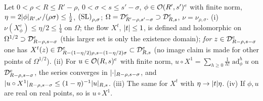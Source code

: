 \begin{theorem}\label{bpN:p11:composition}
Let $0<\rho<R\le R'-\rho$, $0<\sigma<s\le s'-\sigma$, $\phi\in\mathcal O(R',s')^e$ with finite norm, $\eta=2\lvert \phi\rvert_{R',s'}/(\rho\sigma)\le\frac12$, $\textup{(SL)}_{\rho,\sigma}$; $\Omega=\mathcal D_{R'-\rho,s'-\sigma}^e\supset\mathcal D_{R,s}^e$, $\nu=\nu_{\rho,\sigma}$.
(i) $\nu(X^c_\phi)\le\eta/2\le\frac14$ on $\Omega$; the flow $X^t$, $\lvert t\rvert\le1$, is defined and holomorphic on $\Omega^{1/2}\supset\mathcal D_{R-\rho,s-\sigma}^e$ (this larger set is only the existence domain); \emph{for $z\in\mathcal D_{R-\rho,s-\sigma}^e$} one has $X^t(z)\in\mathcal D_{R-(1-\eta/2)\rho,s-(1-\eta/2)\sigma}^e\subset\mathcal D_{R,s}^e$ (no image claim is made for other points of $\Omega^{1/2}$).
(ii) For $u\in\mathcal O(R,s)^e$ with finite norm, $u\circ X^1=\sum_{h\ge0}\frac1{h!}\operatorname{ad}^h_\phi u$ on $\mathcal D_{R-\rho,s-\sigma}^e$, the series converges in $\lvert \cdot\rvert_{R-\rho,s-\sigma}$, and $\lvert u\circ X^1\rvert_{R-\rho,s-\sigma}\le(1-\eta)^{-1}\lvert u\rvert_{R,s}$.
(iii) The same for $X^t$ with $\eta\to\lvert t\rvert\eta$. (iv) If $\phi,u$ are real on real points, so is $u\circ X^1$.
\end{theorem}
